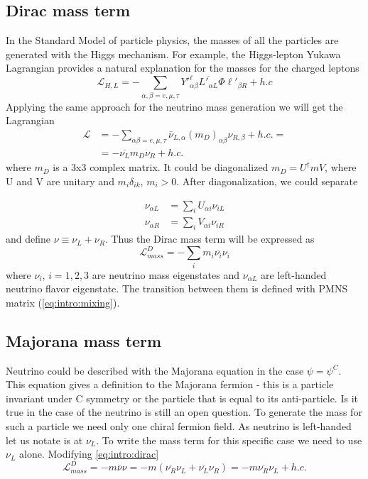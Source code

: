 \documentclass[../main.tex]{subfiles}
\begin{document}
\subsection{Dirac mass term}
In the Standard Model of particle physics, the masses of all the particles are generated with the Higgs mechanism. For example, the Higgs-lepton Yukawa Lagrangian provides a natural explanation for the masses for the charged leptons
\begin{equation}
\mathcal{L}_{H, L}=-\sum_{\alpha, \beta=e,\mu,\tau}Y'^\ell_{\alpha\beta}\overline{L'_{\alpha L}}\Phi\ell'_{\beta R}+h.c
\end{equation}
Applying the same approach for the neutrino mass generation we will get the Lagrangian
\begin{align}
\mathcal{L}&=-\sum_{\alpha\beta=e,\mu,\tau}\bar{\nu}_{L,\alpha}(m_D)_{\alpha\beta}\nu_{R,\beta}+h.c. =\nonumber \\
&=-\overline{\nu_L}m_D\nu_R+h.c.
\end{align}
where $m_D$ is a 3x3 complex matrix. It could be diagonalized $m_D=U^\dag m V$, where U and V are unitary and $m_i\delta_{ik}$, $m_i>0$. After diagonalization, we could separate

\begin{align}
\nu_{\alpha L}&=\sum_iU_{\alpha i}\nu_{iL} \nonumber \\
\nu_{\alpha R}&=\sum_iV_{\alpha i}\nu_{iR}
\end{align}
and define $\nu\equiv\nu_L+\nu_R$. Thus the Dirac mass term will be expressed as
\begin{equation}
\label{eq:intro:dirac}
\mathcal{L}^{D}_{mass}=-\sum_im_i\overline{\nu_i}\nu_i
\end{equation}
where $\nu_i$, $i=1, 2, 3$ are neutrino mass eigenstates and $\nu_{\alpha L}$ are left-handed neutrino flavor eigenstate. The transition between them is defined with PMNS matrix (\autoref{eq:intro:mixing}).

\subsection{Majorana mass term}
Neutrino could be described with the Majorana equation in the case $\psi=\psi^C$. This equation gives a definition to the Majorana fermion - this is a particle invariant under C symmetry or the particle that is equal to its anti-particle. Is it true in the case of the neutrino is still an open question. To generate the mass for such a particle we need only one chiral fermion field. As neutrino is left-handed let us notate is at $\nu_L$. To write the mass term for this specific case we need to use $\nu_L$ alone. Modifying \autoref{eq:intro:dirac}
\begin{equation}
\mathcal{L}^D_{mass}=-m\overline{\nu}\nu=-m\left(\overline{\nu_R}\nu_L+\overline{\nu_L}\nu_R\right)=-m\overline{\nu_R}\nu_L+h.c.
\end{equation}
\end{document}
